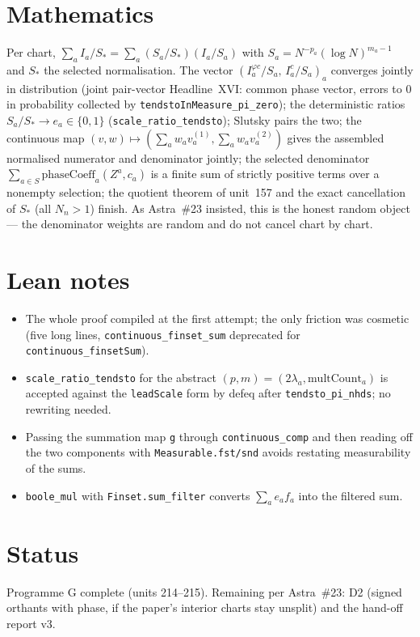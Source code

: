 \documentclass[11pt]{article}
\begin{document}
\section{Mathematics}
Per chart, $\sum_aI_a/S_*=\sum_a(S_a/S_*)(I_a/S_a)$ with $S_a=N^{-p_a}(\log N)^{m_a-1}$ and
$S_*$ the selected normalisation. The vector $(I_a^{\varphi c}/S_a,\,I_a^{c}/S_a)_a$ converges jointly
in distribution (joint pair-vector Headline~XVI: common phase vector, errors to $0$ in probability
collected by \texttt{tendstoInMeasure\_pi\_zero}); the deterministic ratios $S_a/S_*\to e_a\in\{0,1\}$
(\texttt{scale\_ratio\_tendsto}); Slutsky pairs the two; the continuous map
$(v,w)\mapsto(\sum_aw_av_a^{(1)},\sum_aw_av_a^{(2)})$ gives the assembled normalised numerator and
denominator jointly; the selected denominator $\sum_{a\in S}\mathrm{phaseCoeff}_a(Z^a,c_a)$ is a
finite sum of strictly positive terms over a nonempty selection; the quotient theorem of unit~157 and
the exact cancellation of $S_*$ (all $N_n>1$) finish. As Astra~\#23 insisted, this is the honest
random object --- the denominator weights are random and do not cancel chart by chart.

\section{Lean notes}
\begin{itemize}
\item The whole proof compiled at the first attempt; the only friction was cosmetic (five long
  lines, \texttt{continuous\_finset\_sum} deprecated for \texttt{continuous\_finsetSum}).
\item \texttt{scale\_ratio\_tendsto} for the abstract $(p,m)=(2\lambda_a,\mathrm{multCount}_a)$ is
  accepted against the \texttt{leadScale} form by defeq after \texttt{tendsto\_pi\_nhds}; no
  rewriting needed.
\item Passing the summation map \texttt{g} through \texttt{continuous\_comp} and then reading off the
  two components with \texttt{Measurable.fst/snd} avoids restating measurability of the sums.
\item \texttt{boole\_mul} with \texttt{Finset.sum\_filter} converts $\sum_ae_af_a$ into the
  filtered sum.
\end{itemize}

\section{Status}
Programme G complete (units 214--215). Remaining per Astra~\#23: D2 (signed orthants with phase, if
the paper's interior charts stay unsplit) and the hand-off report v3.
\end{document}
